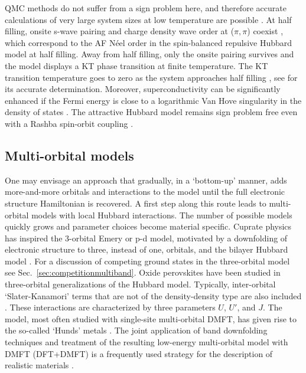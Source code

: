 \documentclass{ar-1col}
\begin{document}
QMC methods do not suffer from a sign problem here, and therefore accurate calculations of very large system sizes at low temperature are possible \cite{Scalettar89A}. 
At half filling, onsite s-wave pairing and charge density wave order at ($\pi, \pi$) coexist \cite{Hirsch85}, which correspond to the AF N\'{e}el order in
the spin-balanced repulsive Hubbard model at half filling. Away from half filling, only the onsite pairing survives and the model displays a KT phase transition at finite temperature. The KT transition temperature goes to zero as the system approaches
half filling \cite{Scalettar89A,Moreo91}, see \cite{Paiva04} for its accurate determination. Moreover, superconductivity can be significantly enhanced if the Fermi energy is close to a logarithmic Van Hove singularity in the density of states \cite{Hirsch86}.
The attractive Hubbard model remains sign problem free even with a Rashba spin-orbit coupling \cite{Shi16}.


\subsection{Multi-orbital models}
One may envisage an approach that gradually, in a `bottom-up' manner, adds more-and-more orbitals and interactions to the model until the full electronic structure Hamiltonian is recovered. 
A first step along this route leads to multi-orbital models with local Hubbard interactions. The number of possible models quickly grows and parameter choices become material specific. 
Cuprate physics has inspired the 3-orbital  Emery \cite{Emery87,Cui20} or p-d model, motivated by a downfolding of electronic structure to three, instead of one, orbitals, and the bilayer Hubbard model \cite{Maier11}. For a discussion of competing ground states in the three-orbital model see Sec.~\ref{sec:competitionmultiband}. 
Oxide perovskites have been studied in three-orbital generalizations of the Hubbard model. Typically, inter-orbital `Slater-Kanamori' terms that are not of the density-density type are also included \cite{Imada98}. These interactions are characterized by three parameters $U$, $U'$, and $J$. The model, most often studied with single-site multi-orbital DMFT, has given rise to the so-called `Hunds' metals \cite{Georges13}. The joint application of band downfolding techniques and treatment of the resulting low-energy multi-orbital model with DMFT (DFT+DMFT) is a frequently used strategy for the description of realistic materials \cite{Kotliar06}.
\begin{marginnote}
\end{marginnote}
\end{document}
